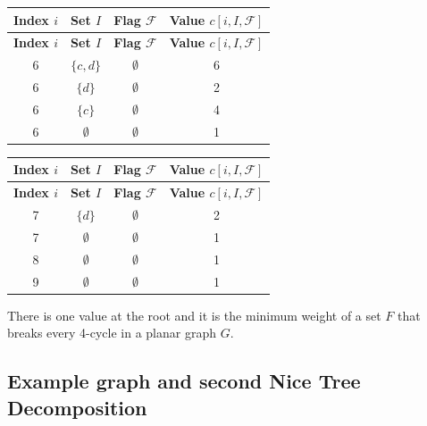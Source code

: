 \begin{minipage}{0.48\textwidth}
    \begin{longtable}{|c|c|c|c|}
    \hline
    \textbf{Index \(i\)} & \textbf{Set \(I\)} & \textbf{Flag \( \mathcal{F} \)} & \textbf{Value \( c[i, I, \mathcal{F}] \)} \\
    \hline
    \endfirsthead
    \hline
    \textbf{Index \(i\)} & \textbf{Set \(I\)} & \textbf{Flag \( \mathcal{F} \)} & \textbf{Value \( c[i, I, \mathcal{F}] \)} \\
    \hline
    \endhead
    \hline
    \endfoot

    6 & \( \{ c, d \} \) & \( \emptyset \) & 6 \\
    6 & \( \{ d \} \) & \( \emptyset \) & 2 \\
    6 & \( \{ c \} \) & \( \emptyset \) & 4 \\
    6 & \( \emptyset \) & \( \emptyset \) & 1 \\
    \hline
    \end{longtable}
\end{minipage}
\hfill
\begin{minipage}{0.48\textwidth}
    \begin{longtable}{|c|c|c|c|}
    \hline
    \textbf{Index \(i\)} & \textbf{Set \(I\)} & \textbf{Flag \( \mathcal{F} \)} & \textbf{Value \( c[i, I, \mathcal{F}] \)} \\
    \hline
    \endfirsthead
    \hline
    \textbf{Index \(i\)} & \textbf{Set \(I\)} & \textbf{Flag \( \mathcal{F} \)} & \textbf{Value \( c[i, I, \mathcal{F}] \)} \\
    \hline
    \endhead
    \hline
    \endfoot

    7 & \( \{ d \} \) & \( \emptyset \) & 2 \\
    7 & \( \emptyset \) & \( \emptyset \) & 1 \\
    \hline
    8 & \( \emptyset \) & \( \emptyset \) & 1 \\
    \hline
    9 & \( \emptyset \) & \( \emptyset \) & 1 \\
    \hline
    \end{longtable}
\end{minipage}

There is one value at the root and it is the minimum weight of a set $F$ that breaks 
every 4-cycle in a planar graph $G$.

\newpage

\subsection{Example graph and second Nice Tree Decomposition}

